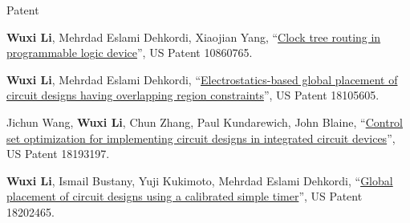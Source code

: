 \begin{rSection}{Patent}

\begin{description}[font=\normalfont]

\item[{[P1]}]{
    \textbf{Wuxi Li}, Mehrdad Eslami Dehkordi, Xiaojian Yang,
    ``\href{https://patents.google.com/patent/US10860765B1/en}{Clock tree routing in programmable logic device}'',
    US Patent 10860765.
}

\item[{[P2]}]{
    \textbf{Wuxi Li}, Mehrdad Eslami Dehkordi,
    ``\href{https://patents.google.com/patent/US20240265182A1/en}{Electrostatics-based global placement of circuit designs having overlapping region constraints}'',
    US Patent 18105605.
}

\item[{[P3]}]{
    Jichun Wang, \textbf{Wuxi Li}, Chun Zhang, Paul Kundarewich, John Blaine,
    ``\href{https://patents.google.com/patent/US20240330558A1/en}{Control set optimization for implementing circuit designs in integrated circuit devices}'',
    US Patent 18193197.
}

\item[{[P4]}]{
    \textbf{Wuxi Li}, Ismail Bustany, Yuji Kukimoto, Mehrdad Eslami Dehkordi,
    ``\href{https://www.freepatentsonline.com/y2024/0394453.html}{Global placement of circuit designs using a calibrated simple timer}'',
    US Patent 18202465.
}

\end{description}

\end{rSection}
